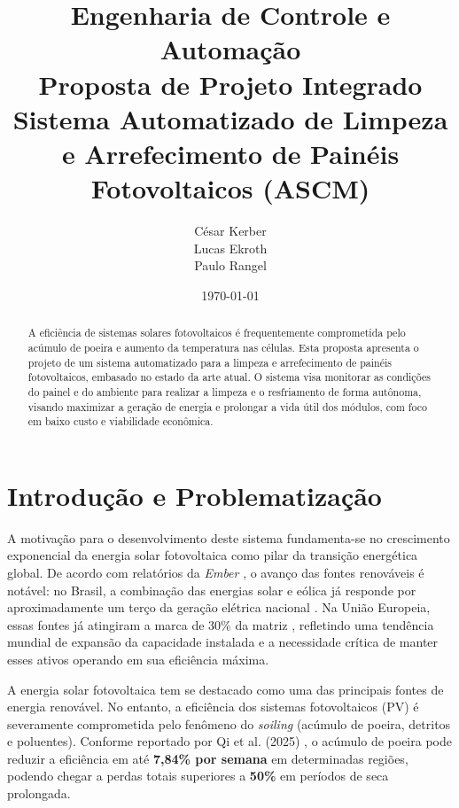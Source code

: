 \documentclass[12pt, a4paper]{article}
\title{
    \vspace{-1cm}
    \Large \textbf{Engenharia de Controle e Automação} \\
    \vspace{1cm}
    \Huge \textbf{Proposta de Projeto Integrado} \\
    \vspace{0.5cm}
    \LARGE \textcolor{blue!60!black}{Sistema Automatizado de Limpeza e Arrefecimento de Painéis Fotovoltaicos (ASCM)}
}
\author{\textbf{} César Kerber\\ Lucas Ekroth\\ Paulo Rangel}
\date{\today}
\begin{document}
\maketitle

\thispagestyle{empty}

\vspace{1.5cm}

\begin{abstract}
\noindent A eficiência de sistemas solares fotovoltaicos é frequentemente comprometida pelo acúmulo de poeira e aumento da temperatura nas células. Esta proposta apresenta o projeto de um sistema automatizado para a limpeza e arrefecimento de painéis fotovoltaicos, embasado no estado da arte atual. O sistema visa monitorar as condições do painel e do ambiente para realizar a limpeza e o resfriamento de forma autônoma, visando maximizar a geração de energia e prolongar a vida útil dos módulos, com foco em baixo custo e viabilidade econômica.
\end{abstract}

\newpage
\tableofcontents
\newpage

\section{Introdução e Problematização}

A motivação para o desenvolvimento deste sistema fundamenta-se no crescimento exponencial da energia solar fotovoltaica como pilar da transição energética global. De acordo com relatórios da \textit{Ember} \cite{ember_brazil_2024, ember_eu_2026}, o avanço das fontes renováveis é notável: no Brasil, a combinação das energias solar e eólica já responde por aproximadamente um terço da geração elétrica nacional \cite{ember_brazil_2024}. Na União Europeia, essas fontes já atingiram a marca de 30\% da matriz \cite{ember_eu_2026}, refletindo uma tendência mundial de expansão da capacidade instalada e a necessidade crítica de manter esses ativos operando em sua eficiência máxima.

A energia solar fotovoltaica tem se destacado como uma das principais fontes de energia renovável. No entanto, a eficiência dos sistemas fotovoltaicos (PV) é severamente comprometida pelo fenômeno do \textit{soiling} (acúmulo de poeira, detritos e poluentes). Conforme reportado por Qi et al. (2025) \cite{qi2025}, o acúmulo de poeira pode reduzir a eficiência em até \textbf{7,84\% por semana} em determinadas regiões, podendo chegar a perdas totais superiores a \textbf{50\%} em períodos de seca prolongada.
\end{document}
